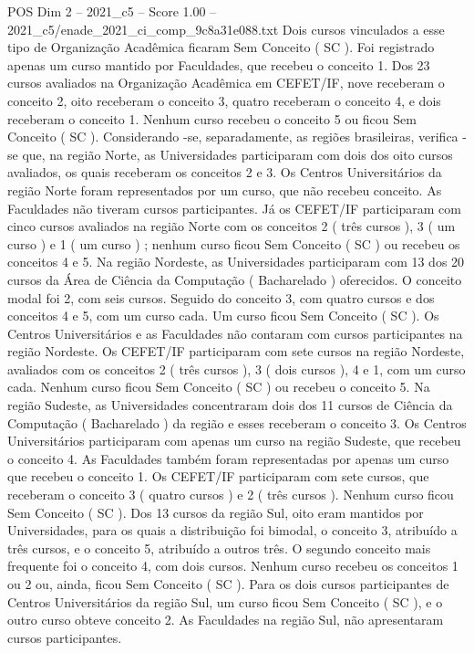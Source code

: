 \begin{textsample}{POS Dim 2 – 2021\_c5 – Score 1.00 – 2021\_c5/enade\_2021\_ci\_comp\_9c8a31e088.txt}
Dois cursos vinculados a esse tipo de Organização Acadêmica ficaram Sem Conceito ( SC ).
Foi registrado apenas um curso mantido por Faculdades, que recebeu o conceito 1.
Dos 23 cursos avaliados na Organização Acadêmica em CEFET/IF, nove receberam o conceito 2, oito receberam o conceito 3, quatro receberam o conceito 4, e dois receberam o conceito 1.
Nenhum curso recebeu o conceito 5 ou ficou Sem Conceito ( SC ).
Considerando -se, separadamente, as regiões brasileiras, verifica -se que, na região Norte, as Universidades participaram com dois dos oito cursos avaliados, os quais receberam os conceitos 2 e 3.
Os Centros Universitários da região Norte foram representados por um curso, que não recebeu conceito.
As Faculdades não tiveram cursos participantes.
Já os CEFET/IF participaram com cinco cursos avaliados na região Norte com os conceitos 2 ( três cursos ), 3 ( um curso ) e 1 ( um curso ) ; nenhum curso ficou Sem Conceito ( SC ) ou recebeu os conceitos 4 e 5.
Na região Nordeste, as Universidades participaram com 13 dos 20 cursos da Área de Ciência da Computação ( Bacharelado ) oferecidos.
O conceito modal foi 2, com seis cursos.
Seguido do conceito 3, com quatro cursos e dos conceitos 4 e 5, com um curso cada.
Um curso ficou Sem Conceito ( SC ).
Os Centros Universitários e as Faculdades não contaram com cursos participantes na região Nordeste.
Os CEFET/IF participaram com sete cursos na região Nordeste, avaliados com os conceitos 2 ( três cursos ), 3 ( dois cursos ), 4 e 1, com um curso cada.
Nenhum curso ficou Sem Conceito ( SC ) ou recebeu o conceito 5.
Na região Sudeste, as Universidades concentraram dois dos 11 cursos de Ciência da Computação ( Bacharelado ) da região e esses receberam o conceito 3.
Os Centros Universitários participaram com apenas um curso na região Sudeste, que recebeu o conceito 4.
As Faculdades também foram representadas por apenas um curso que recebeu o conceito 1.
Os CEFET/IF participaram com sete cursos, que receberam o conceito 3 ( quatro cursos ) e 2 ( três cursos ).
Nenhum curso ficou Sem Conceito ( SC ).
Dos 13 cursos da região Sul, oito eram mantidos por Universidades, para os quais a distribuição foi bimodal, o conceito 3, atribuído a três cursos, e o conceito 5, atribuído a outros três.
O segundo conceito mais frequente foi o conceito 4, com dois cursos.
Nenhum curso recebeu os conceitos 1 ou 2 ou, ainda, ficou Sem Conceito ( SC ).
Para os dois cursos participantes de Centros Universitários da região Sul, um curso ficou Sem Conceito ( SC ), e o outro curso obteve conceito 2.
As Faculdades na região Sul, não apresentaram cursos participantes.

\end{textsample}

